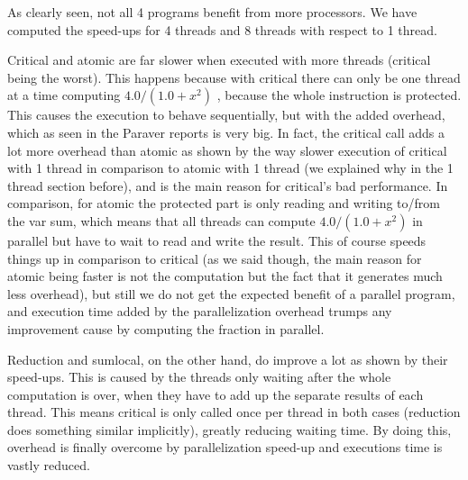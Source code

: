 \documentclass[12]{article}
\begin{document}
As clearly seen, not all 4 programs benefit from more processors. We have computed the speed-ups for 4 threads and 8 threads with respect to 1 thread. 

Critical and atomic are far slower when executed with more threads (critical being the worst). This happens because with critical there can only be one thread at a time computing $4.0/(1.0+x^2)$ , because the whole instruction is protected. This causes the execution to behave sequentially, but with the added overhead, which as seen in the Paraver reports is very big. In fact, the critical call adds a lot more overhead than atomic as shown by the way slower execution of critical with 1 thread in comparison to atomic with 1 thread (we explained why in the 1 thread section before), and is the main reason for critical's bad performance. In comparison, for atomic the protected part is only reading and writing to/from the var sum, which means that all threads can compute $4.0/(1.0+x^2)$ in parallel but have to wait to read and write the result. This of course speeds things up in comparison to critical (as we said though, the main reason for atomic being faster is not the computation but the fact that it generates much less overhead), but still we do not get the expected benefit of a parallel program, and execution time added by the parallelization overhead trumps any improvement cause by computing the fraction in parallel.

Reduction and sumlocal, on the other hand, do improve a lot as shown by their speed-ups. This is caused by the threads only waiting after the whole computation is over, when they have to add up the separate results of each thread. This means critical is only called once per thread in both cases (reduction does something similar implicitly), greatly reducing waiting time. By doing this, overhead is finally overcome by parallelization speed-up and executions time is vastly reduced.
\end{document}
